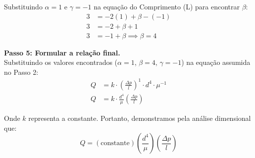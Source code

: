 Substituindo $\alpha = 1$ e $\gamma = -1$ na equação do Comprimento (L) para encontrar $\beta$:
\begin{align*}
3 &= -2(1) + \beta - (-1) \\
3 &= -2 + \beta + 1 \\
3 &= -1 + \beta \implies \beta = 4
\end{align*}

\textbf{Passo 5: Formular a relação final.} \\
Substituindo os valores encontrados ($\alpha = 1$, $\beta = 4$, $\gamma = -1$) na equação assumida no Passo 2:
\begin{align*}
Q &= k \cdot \left(\frac{\Delta p}{l}\right)^1 \cdot d^4 \cdot \mu^{-1} \\
Q &= k \cdot \frac{d^4}{\mu} \left(\frac{\Delta p}{l}\right)
\end{align*}

Onde $k$ representa a constante. Portanto, demonstramos pela análise dimensional que:
\[ Q = (\text{constante})\left( \frac{d^4}{\mu} \right)\left( \frac{\Delta p}{l} \right) \]
